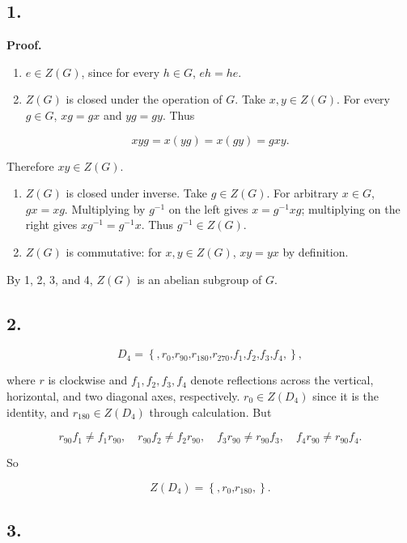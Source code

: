 \subsection{1.}

\textbf{Proof.}

\begin{enumerate}
\item
  \(e \in Z(G)\), since for every \(h \in G\), \(eh = he\).
\item
  \(Z(G)\) is closed under the operation of \(G\). Take \(x,y \in Z(G)\). For every \(g \in G\), \(xg = gx\) and \(yg = gy\). Thus
\end{enumerate}

\[xyg = x\left( {yg} \right) = x\left( {gy} \right) = gxy.\]

Therefore \(xy \in Z(G)\).

\begin{enumerate}
\item
  \(Z(G)\) is closed under inverse. Take \(g \in Z(G)\). For arbitrary \(x \in G\), \(gx = xg\). Multiplying by \(g^{- 1}\) on the left gives \(x = g^{- 1}xg\); multiplying on the right gives \(xg^{- 1} = g^{- 1}x\). Thus \(g^{- 1} \in Z(G)\).
\item
  \(Z(G)\) is commutative: for \(x,y \in Z(G)\), \(xy = yx\) by definition.
\end{enumerate}

By 1, 2, 3, and 4, \(Z(G)\) is an abelian subgroup of \(G\).

\subsection{2.}

\[D_{4} = \left\{ {,r_{0}\text{,}r_{90}\text{,}r_{180}\text{,}r_{270}\text{,}f_{1}\text{,}f_{2}\text{,}f_{3}\text{,}f_{4},} \right\},\]

where \(r\) is clockwise and \(f_{1},f_{2},f_{3},f_{4}\) denote reflections across the vertical, horizontal, and two diagonal axes, respectively. \(r_{0} \in Z\left( D_{4} \right)\) since it is the identity, and \(r_{180} \in Z\left( D_{4} \right)\) through calculation. But

\[r_{90}f_{1} \neq f_{1}r_{90},\quad r_{90}f_{2} \neq f_{2}r_{90},\quad f_{3}r_{90} \neq r_{90}f_{3},\quad f_{4}r_{90} \neq r_{90}f_{4}.\]

So

\[Z\left( D_{4} \right) = \left\{ {,r_{0}\text{,}r_{180},} \right\}.\]

\subsection{3.}

